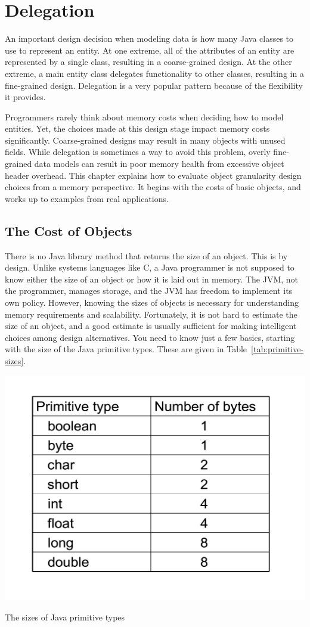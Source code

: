 \documentclass{book}
\theoremstyle{definition}
\begin{document}
\chapter{Delegation}

An important design decision when modeling data is how many Java classes to use to represent an entity. At one extreme, all of the attributes of an entity are represented by a single class, resulting in a coarse-grained design. At the other extreme, a main entity class delegates functionality to other classes, resulting in a fine-grained design.  Delegation is a very popular pattern because of the flexibility it provides. 

Programmers rarely think about memory costs when deciding how to model entities. Yet, the choices made at this design stage impact memory costs significantly. Coarse-grained designs may result in many objects with unused fields. While delegation is sometimes a way to avoid this problem, overly fine-grained data models can result in poor memory health from excessive object header overhead. This chapter explains how to evaluate object granularity design choices from a memory perspective. It begins with the costs of basic objects, and works up to examples from real applications.
  
\section{The Cost of Objects}
\label{sec:CostOfObjects}

There is no Java library method that returns the size of an object. This is by design. Unlike systems languages like C, a Java programmer is not supposed to know either the size of an object or how it is laid out in memory. The JVM, not the programmer, manages storage, and the JVM has freedom to implement its own policy. However, knowing the sizes of objects is necessary for understanding memory requirements and scalability. Fortunately, it is not hard to estimate the size of an object, and a good estimate is usually sufficient for making intelligent choices among design alternatives. You need to know just a few basics, starting with the size of the Java primitive types. These are given in Table~\ref{tab:primitive-sizes}.
\begin{table}
  \centering
 \includegraphics[width=.50\textwidth]{Figures/chapter4/primitive-byte-sizes.pdf}
  \caption{The sizes of Java primitive types}
  \label{tab:primitive-sizes}
\end{table}
\end{document}

